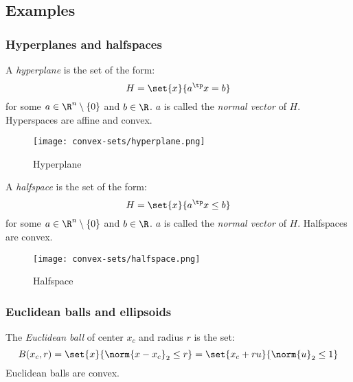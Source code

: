 \subsection{Examples}
\subsubsection{Hyperplanes and halfspaces}
\begin{definition}[Hyperplane]
    A \emph{hyperplane} is the set of the form:
    \begin{equation*}
        H = \set{x}{a^\tp x = b}
    \end{equation*}
    for some $a\in\R^n\setminus\{0\}$ and $b\in\R$. $a$ is called the \emph{normal vector} of $H$. Hyperspaces are affine and convex.

    \begin{figure}[H]
        \centering
        \texttt{[image: convex-sets/hyperplane.png]}
        \caption{Hyperplane}
    \end{figure}
\end{definition}

\begin{definition}[Halfspace]
    A \emph{halfspace} is the set of the form:
    \begin{equation*}
        H = \set{x}{a^\tp x\leq b}
    \end{equation*}
    for some $a\in\R^n\setminus\{0\}$ and $b\in\R$. $a$ is called the \emph{normal vector} of $H$. Halfspaces are convex.

    \begin{figure}[H]
        \centering
        \texttt{[image: convex-sets/halfspace.png]}
        \caption{Halfspace}
    \end{figure}
\end{definition}

\subsubsection{Euclidean balls and ellipsoids}
\begin{definition}
    The \emph{Euclidean ball} of center $x_c$ and radius $r$ is the set:
    \begin{equation*}
        B(x_c, r) = \set{x}{\norm{x - x_c}_2\leq r} = \set{x_c+ru}{\norm{u}_2\leq 1}
    \end{equation*}
    Euclidean balls are convex.
\end{definition}

